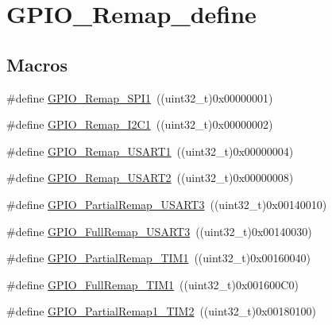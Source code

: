 \hypertarget{group___g_p_i_o___remap__define}{}\section{G\+P\+I\+O\+\_\+\+Remap\+\_\+define}
\label{group___g_p_i_o___remap__define}
\subsection*{Macros}
\begin{DoxyCompactItemize}
\item 
\#define \mbox{\hyperlink{group___g_p_i_o___remap__define_ga58b02a04a6041954c6e99e681716ab4c}{G\+P\+I\+O\+\_\+\+Remap\+\_\+\+S\+P\+I1}}~((uint32\+\_\+t)0x00000001)
\item 
\#define \mbox{\hyperlink{group___g_p_i_o___remap__define_ga6cf601e6db62cb2e9dbbccb276401b18}{G\+P\+I\+O\+\_\+\+Remap\+\_\+\+I2\+C1}}~((uint32\+\_\+t)0x00000002)
\item 
\#define \mbox{\hyperlink{group___g_p_i_o___remap__define_ga804d946c5ca246a1f02f73a086586fd6}{G\+P\+I\+O\+\_\+\+Remap\+\_\+\+U\+S\+A\+R\+T1}}~((uint32\+\_\+t)0x00000004)
\item 
\#define \mbox{\hyperlink{group___g_p_i_o___remap__define_gaeb2ebb12e23138509af20dce1fc6c246}{G\+P\+I\+O\+\_\+\+Remap\+\_\+\+U\+S\+A\+R\+T2}}~((uint32\+\_\+t)0x00000008)
\item 
\#define \mbox{\hyperlink{group___g_p_i_o___remap__define_ga97af4aa8dded530353160cca615ad201}{G\+P\+I\+O\+\_\+\+Partial\+Remap\+\_\+\+U\+S\+A\+R\+T3}}~((uint32\+\_\+t)0x00140010)
\item 
\#define \mbox{\hyperlink{group___g_p_i_o___remap__define_gaa8831190b5b68e9f871955b791fa358b}{G\+P\+I\+O\+\_\+\+Full\+Remap\+\_\+\+U\+S\+A\+R\+T3}}~((uint32\+\_\+t)0x00140030)
\item 
\#define \mbox{\hyperlink{group___g_p_i_o___remap__define_ga0e94344776c53a76f6e9d933139c05a6}{G\+P\+I\+O\+\_\+\+Partial\+Remap\+\_\+\+T\+I\+M1}}~((uint32\+\_\+t)0x00160040)
\item 
\#define \mbox{\hyperlink{group___g_p_i_o___remap__define_gaf1f2d5cbc2281b3e3a6cc51c3fe7f77f}{G\+P\+I\+O\+\_\+\+Full\+Remap\+\_\+\+T\+I\+M1}}~((uint32\+\_\+t)0x001600\+C0)
\item 
\#define \mbox{\hyperlink{group___g_p_i_o___remap__define_ga7ad69d3e2643b2bfee4eebbea4a5b80e}{G\+P\+I\+O\+\_\+\+Partial\+Remap1\+\_\+\+T\+I\+M2}}~((uint32\+\_\+t)0x00180100)
\item 

\end{DoxyCompactItemize}
